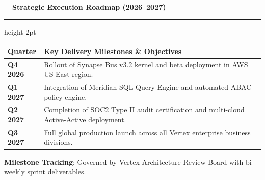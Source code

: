 \documentclass[landscape]{slides}
\newcommand{\slidetitle}[1]{%
  {\Large\bfseries\color{NavyDark} #1}\par\vspace{0.3em}%
  {\color{TealAccent}\hrule height 2pt}\vspace{0.6em}%
}
\begin{document}
\begin{slide}
\slidetitle{\faCalendar~~Strategic Execution Roadmap (2026--2027)}

\small
\centering
\begin{tabular}{l p{14cm}}
\toprule
\rowcolor{TableHeadBg}
\color{white}\textbf{Quarter} & \color{white}\textbf{Key Delivery Milestones \& Objectives} \\
\midrule
\textbf{Q4 2026} & Rollout of Synapse Bus v3.2 kernel and beta deployment in AWS US-East region. \\
\rowcolor{RowAltBg}
\textbf{Q1 2027} & Integration of Meridian SQL Query Engine and automated ABAC policy engine. \\
\textbf{Q2 2027} & Completion of SOC2 Type II audit certification and multi-cloud Active-Active deployment. \\
\rowcolor{RowAltBg}
\textbf{Q3 2027} & Full global production launch across all Vertex enterprise business divisions. \\
\bottomrule
\end{tabular}

\vspace{0.6em}
\begin{tcolorbox}[colback=CardBg,colframe=BorderGray,arc=3pt,boxrule=1pt]
  \small\color{TextDark}\centering
  \textbf{Milestone Tracking}: Governed by Vertex Architecture Review Board with bi-weekly sprint deliverables.
\end{tcolorbox}
\end{slide}
\end{document}
